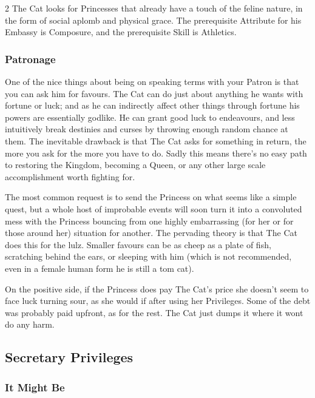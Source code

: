 \begin{multicols}{2}
The Cat looks for Princesses that already have a touch of the feline nature, in the form of social aplomb and physical grace. The prerequisite Attribute for his Embassy is Composure, and the prerequisite Skill is Athletics. 

\begin{mybox}


 
 \subsubsection*{Patronage}
 
 One of the nice things about being on speaking terms with your Patron is that you can ask him for favours. The Cat can do just about anything he wants with fortune or luck; and as he can indirectly affect other things through fortune his powers are essentially godlike. He can grant good luck to endeavours, and less intuitively break destinies and curses by throwing enough random chance at them. The inevitable drawback is that The Cat asks for something in return, the more you ask for the more you have to do. Sadly this means there's no easy path to restoring the Kingdom, becoming a Queen, or any other large scale accomplishment worth fighting for. 
 
 The most common request is to send the Princess on what seems like a simple quest, but a whole host of improbable events will soon turn it into a convoluted mess with the Princess bouncing from one highly embarrassing (for her or for those around her) situation for another. The pervading theory is that The Cat does this for the lulz. Smaller favours can be as cheep as a plate of fish, scratching behind the ears, or sleeping with him (which is not recommended, even in a female human form he is still a tom cat). 
 
 On the positive side, if the Princess does pay The Cat's price she doesn’t seem to face luck turning sour, as she would if after using her Privileges. Some of the debt was probably paid upfront, as for the rest. The Cat just dumps it where it wont do any harm. 
 
\end{mybox}

\subsection*{Secretary Privileges}




\subsubsection*{It Might Be}


\end{multicols}
